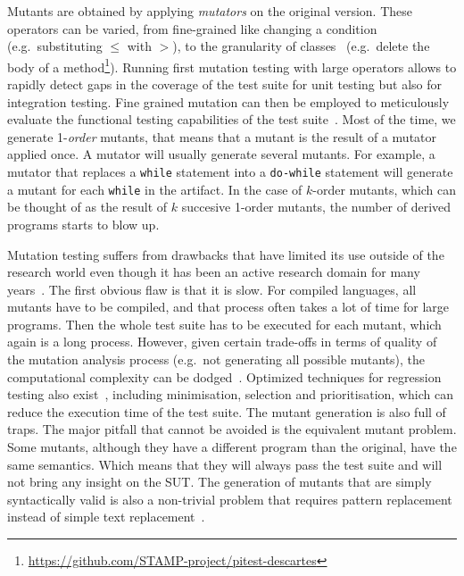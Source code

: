 \documentclass[a4paper,11pt]{sdm_internship}
\newcommand{\addref}[1]{\colorbox{TealBlue!100}{\textcolor{white}{\textbf{$[$\ifx&#1&\ \else#1\fi$]$}}}}
\newcommand{\todo}[1]{\colorbox{Red!75}{\textcolor{white}{\textbf{TODO\ifx&#1&\else: #1\fi}}}}
\theoremstyle{definition}
\begin{document}


Mutants are obtained by applying \emph{mutators} on the original version.
These operators can be varied, from fine-grained like changing a condition (e.g.\ substituting $\leq$ with $>$), to the granularity of classes~\cite{segura2011mutation} (e.g.\ delete the body of a method\footnote{\url{https://github.com/STAMP-project/pitest-descartes}}).
Running first mutation testing with large operators allows to rapidly detect gaps in the coverage of the test suite for unit testing but also for integration testing.
Fine grained mutation can then be employed to meticulously evaluate the functional testing capabilities of the test suite~\cite{howden1982weak}.
Most of the time, we generate 1-\emph{order} mutants, that means that a mutant is the result of a mutator applied once.
A mutator will usually generate several mutants.
For example, a mutator that replaces a \texttt{while} statement into a \texttt{do-while} statement will generate a mutant for each \texttt{while} in the artifact.
In the case of $k$-order mutants, which can be thought of as the result of $k$ succesive 1-order mutants\cite{wah2000theoretical}, the number of derived programs starts to blow up.

Mutation testing suffers from drawbacks that have limited its use outside of the research world even though it has been an active research domain for many years~\cite{jia2011analysis}.
The first obvious flaw is that it is slow.
For compiled languages, all mutants have to be compiled, and that process often takes a lot of time for large programs.
Then the whole test suite has to be executed for each mutant, which again is a long process.
However, given certain trade-offs in terms of quality of the mutation analysis process (e.g.\ not generating all possible mutants), the computational complexity can be dodged~\cite{offutt1993experimental,movzucha2016mutation}.
Optimized techniques for regression testing also exist~\cite{yoo2012regression}, including minimisation, selection and prioritisation, which can reduce the execution time of the test suite.
The mutant generation is also full of traps.
The major pitfall that cannot be avoided is the equivalent mutant problem.
Some mutants, although they have a different program than the original, have the same semantics.
Which means that they will always pass the test suite and will not bring any insight on the SUT\@.
The generation of mutants that are simply syntactically valid is also a non-trivial problem that requires pattern replacement instead of simple text replacement~\cite{simao2009transformational}.
\end{document}
